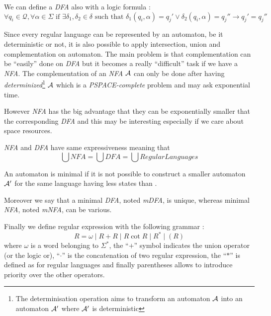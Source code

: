 We can define a \textit{DFA} also with a logic formula :
\[\forall q_i \in \mathcal{Q}, \forall \alpha \in \Sigma \text{ if } \exists \delta_1, \delta_2 \in \delta \text{ such that } \delta_1(q_i, \alpha) = q_j' \vee \delta_2(q_i, \alpha) = q_j'' \rightarrow q_j' = q_j'' \]

Since every regular language can be represented by an automaton, be it deterministic or not, it is also possible to apply intersection, union and complementation on automaton. The main problem is that complementation can be ``easily'' done on \textit{DFA} but it becomes a really ``difficult'' task if we have a \textit{NFA}. The complementation of an \textit{NFA} $\mathcal{A}$ can only be done after having \textit{determinized}\footnote{The determinisation operation aims to transform an automaton $\mathcal{A}$ into an automaton $\mathcal{A}'$ where $\mathcal{A}'$ is deterministic} $\mathcal{A}$ which is a \textit{PSPACE-complete} problem and may ask exponential time.

However \textit{NFA} has the big advantage that they can be exponentially smaller that the corresponding \textit{DFA} and this may be interesting especially if we care about space resources.

\begin{remark}
  \textit{NFA} and \textit{DFA} have same expressiveness meaning that \[\bigcup NFA = \bigcup DFA = \bigcup RegularLanguages\]
\end{remark}

\begin{definition}
  An automaton \automaton{} is minimal if it is not possible to construct a smaller automaton $\mathcal{A}{}'$ for the same language having less states than \automaton{}.
\end{definition}

Moreover we say that a minimal \textit{DFA}, noted \textit{mDFA}, is unique, whereas minimal \textit{NFA}, noted \textit{mNFA}, can be various.

Finally we define regular expression with the following grammar :
\[R = \omega \mid R + R \mid R \cot R \mid R^* \mid (R)\]
where $\omega$ is a word belonging to $\Sigma^*$, the ``$+$'' symbol indicates the union operator (or the logic or), ``$\cdot$'' is the concatenation of two regular expression, the ``$*$'' is defined as for regular languages and finally parentheses allows to introduce priority over the other operators.

